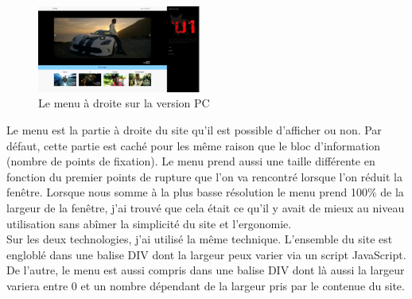 \documentclass{article}
\begin{document}
\begin{figure}
  \vspace{-20pt}
  \begin{center}
    \includegraphics[width=0.48\textwidth]{p2}
  \end{center}
  \vspace{-20pt}
  \caption{Le menu \`a droite sur la version PC}
  \vspace{-10pt}
\end{figure}
Le menu est la partie \`a droite du site qu'il est possible d'afficher ou non. Par d\'efaut, cette partie est cach\'e pour les m\^eme raison que le bloc d'information (nombre de points de fixation). Le menu prend aussi une taille diff\'erente en fonction du premier points de rupture que l'on va rencontr\'e lorsque l'on r\'eduit la fen\^etre. Lorsque nous somme \`a la plus basse r\'esolution le menu prend 100\% de la largeur de la fen\^etre, j'ai trouv\'e que cela \'etait ce qu'il y avait de mieux au niveau utilisation sans ab\^imer la simplicit\'e du site et l'ergonomie.\\
Sur les deux technologies, j'ai utilis\'e la m\^eme technique. L'ensemble du site est englobl\'e dans une balise DIV dont la largeur peux varier via un script JavaScript. De l'autre, le menu est aussi compris dans une balise DIV dont l\`a aussi la largeur variera entre 0 et un nombre d\'ependant de la largeur pris par le contenue du site. \\
\vspace{0.5cm}\\
\end{document}
